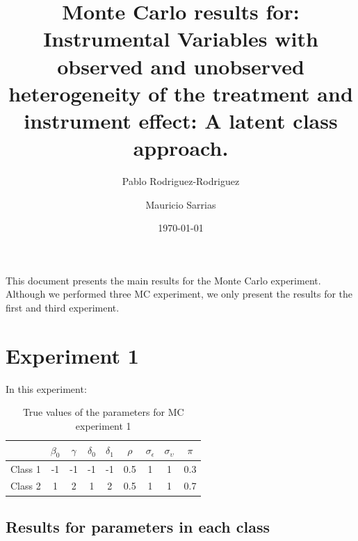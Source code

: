 \documentclass[12pt]{article}\usepackage[]{graphicx}\usepackage[]{xcolor}
\begin{document}
\title{Monte Carlo results for: Instrumental Variables with observed and unobserved heterogeneity of the treatment and instrument effect: A latent class approach. }

\author{Pablo Rodriguez-Rodriguez \and Mauricio Sarrias}


\date{\today}
\maketitle
{}


This document presents the main results for the Monte Carlo experiment. Although we performed three MC experiment, we only present the results for the first and third experiment. 



\section{Experiment 1}

In this experiment:

\begin{table}[H]
\caption{True values of the parameters for MC experiment 1}\label{tab:exp1}
\centering
\begin{tabular}{lcccccccc}
\midrule
  & $\beta_0$  & $\gamma$ & $\delta_0$  & $\delta_1$ & $\rho$ & $\sigma_{\epsilon}$ & $\sigma_{\upsilon}$ & $\pi$ \\
\midrule
Class 1 & -1 & -1  & -1  &  -1 & 0.5 & 1 & 1 & 0.3\\
Class 2 &  1 &  2  &  1  &  2  & 0.5 & 1 & 1 & 0.7\\
\midrule
\end{tabular}
\end{table}

\subsection{Results for parameters in each class}
\end{document}
